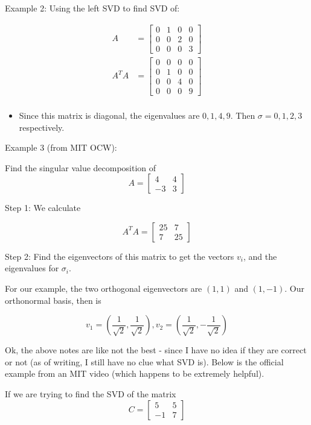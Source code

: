 \documentclass{article}
\begin{document}
Example 2: Using the left SVD to find SVD of:

$$
\begin{aligned}
	A    & =
	\begin{bmatrix}
		0 & 1 & 0 & 0 \\0&0&2&0\\0&0&0&3
	\end{bmatrix} \\
	A^TA & =
	\begin{bmatrix}
		0 & 0 & 0 & 0 \\0&1&0&0\\0&0&4&0\\0&0&0&9
	\end{bmatrix} \\
\end{aligned}
$$

\begin{itemize}
	\item Since this matrix is diagonal, the eigenvalues are $0, 1, 4, 9$. Then $\sigma=0,1,2,3$ respectively.
\end{itemize}

Example 3 (from MIT OCW):

Find the singular value decomposition of $$A=\begin{bmatrix}
		4  & 4 \\
		-3 & 3
\end{bmatrix}$$

Step 1: We calculate

$$
A^TA=\begin{bmatrix}
	25 & 7 \\ 
	7 & 25
\end{bmatrix}
$$

Step 2: Find the eigenvectors of this matrix to get the vectors $v_i$, and the eigenvalues for $\sigma_i$.

For our example, the two orthogonal eigenvectors are $(1, 1)$ and $(1, -1)$. Our orthonormal basis, then is

$$
v_1=\left(\frac{1}{\sqrt{2}}, \frac{1}{\sqrt{2}}\right), v_2=\left(\frac{1}{\sqrt{2}}, -\frac{1}{\sqrt{2}}\right)
$$

Ok, the above notes are like not the best - since I have no idea if they are correct or not (as of writing, I still have no clue what SVD is). Below is the official example from an MIT video (which happens to be extremely helpful).

If we are trying to find the SVD of the matrix $$C = \begin{bmatrix}5&5\\-1&7\end{bmatrix}$$
\end{document}
